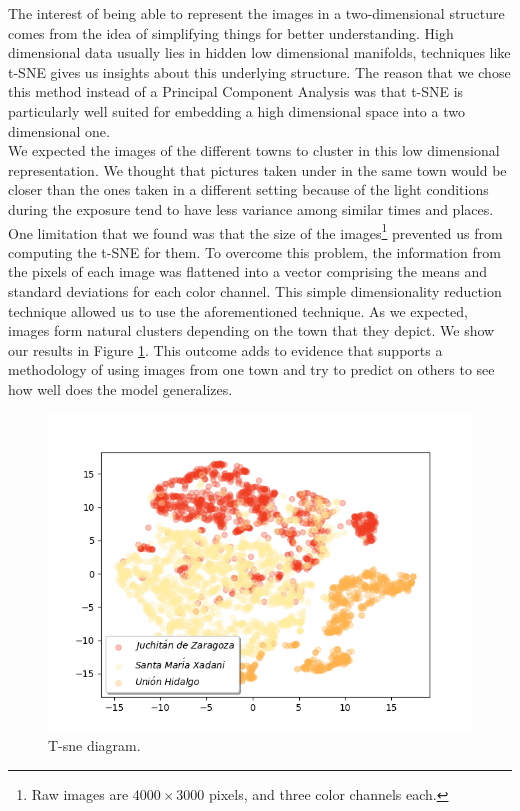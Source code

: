 The interest of being able to represent the images in a two-dimensional structure comes from the idea of simplifying things for better understanding. High dimensional data usually lies in hidden low dimensional manifolds, techniques like t-SNE gives us insights about this underlying structure. The reason that we chose this method instead of a Principal Component Analysis was that t-SNE is particularly well suited for embedding a high dimensional space into a two dimensional one.\\

We expected the images of the different towns to cluster in this low dimensional representation. We thought that pictures taken under in the same town would be closer than the ones taken in a different setting because of the light conditions during the exposure tend to have less variance among similar times and places.\\

One limitation that we found was that the size of the images\footnote{Raw images are $4000\times3000$ pixels, and three color channels each.} prevented us from computing the t-SNE for them. To overcome this problem, the information from the pixels of each image was flattened into a vector comprising the means and standard deviations for each color channel. This simple dimensionality reduction technique allowed us to use the aforementioned technique. As we expected, images form natural clusters depending on the town that they depict. We show our results in Figure \ref{fig:tsne}. This outcome adds to evidence that supports a methodology of using images from one town and try to predict on others to see how well does the model generalizes.\\

\begin{figure}[!h]
  \centering
  \includegraphics[width=1\textwidth]{images/t-sne-bis.png}
  \caption{T-sne diagram.}
  \label{fig:tsne}
\end{figure}

